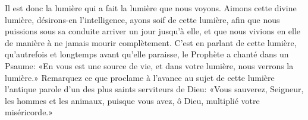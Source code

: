 Il est donc la lumière qui a fait la lumière que nous voyons.
	Aimons cette divine lumière, désirons-en l’intelligence,
		ayons soif de cette lumière,
	afin que nous puissions sous sa conduite arriver un jour jusqu’à elle,
	et que nous vivions en elle de manière à ne jamais mourir complètement.
C’est en parlant de cette lumière,
	qu’autrefois et longtemps avant qu’elle paraisse,
	le Prophète a chanté dans un Psaume:
	«En vous est une source de vie,
		et dans votre lumière, nous verrons la lumière.»
Remarquez ce que proclame à l’avance au sujet de cette lumière
	l’antique parole d’un des plus saints serviteurs de Dieu:
	«Vous sauverez, Seigneur, les hommes et les animaux,
	puisque vous avez, ô Dieu, multiplié votre miséricorde.»
